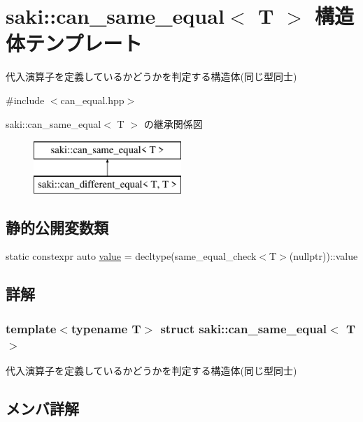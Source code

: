 \hypertarget{structsaki_1_1can__same__equal}{}\section{saki\+:\+:can\+\_\+same\+\_\+equal$<$ T $>$ 構造体テンプレート}
\label{structsaki_1_1can__same__equal}


代入演算子を定義しているかどうかを判定する構造体(同じ型同士)  




{\ttfamily \#include $<$can\+\_\+equal.\+hpp$>$}

saki\+:\+:can\+\_\+same\+\_\+equal$<$ T $>$ の継承関係図\begin{figure}[H]
\begin{center}
\leavevmode
\includegraphics[height=2.000000cm]{structsaki_1_1can__same__equal}
\end{center}
\end{figure}
\subsection*{静的公開変数類}
\begin{DoxyCompactItemize}
\item 
static constexpr auto \mbox{\hyperlink{structsaki_1_1can__same__equal_a7a0e40058e8b1b27113f7fee26fec91f}{value}} = decltype(same\+\_\+equal\+\_\+check$<$T$>$(nullptr))\+::value
\end{DoxyCompactItemize}


\subsection{詳解}
\subsubsection*{template$<$typename T$>$\newline
struct saki\+::can\+\_\+same\+\_\+equal$<$ T $>$}

代入演算子を定義しているかどうかを判定する構造体(同じ型同士) 

\subsection{メンバ詳解}
\mbox{\label{structsaki_1_1can__same__equal_a7a0e40058e8b1b27113f7fee26fec91f}} 
